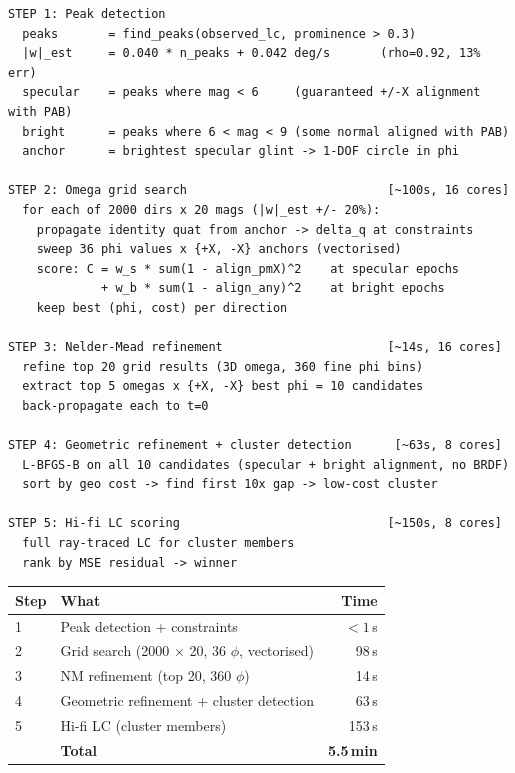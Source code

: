 \documentclass[11pt,a4paper]{article}
\begin{document}
\begin{lstlisting}
STEP 1: Peak detection
  peaks       = find_peaks(observed_lc, prominence > 0.3)
  |w|_est     = 0.040 * n_peaks + 0.042 deg/s       (rho=0.92, 13% err)
  specular    = peaks where mag < 6     (guaranteed +/-X alignment with PAB)
  bright      = peaks where 6 < mag < 9 (some normal aligned with PAB)
  anchor      = brightest specular glint -> 1-DOF circle in phi

STEP 2: Omega grid search                            [~100s, 16 cores]
  for each of 2000 dirs x 20 mags (|w|_est +/- 20%):
    propagate identity quat from anchor -> delta_q at constraints
    sweep 36 phi values x {+X, -X} anchors (vectorised)
    score: C = w_s * sum(1 - align_pmX)^2    at specular epochs
             + w_b * sum(1 - align_any)^2    at bright epochs
    keep best (phi, cost) per direction

STEP 3: Nelder-Mead refinement                       [~14s, 16 cores]
  refine top 20 grid results (3D omega, 360 fine phi bins)
  extract top 5 omegas x {+X, -X} best phi = 10 candidates
  back-propagate each to t=0

STEP 4: Geometric refinement + cluster detection      [~63s, 8 cores]
  L-BFGS-B on all 10 candidates (specular + bright alignment, no BRDF)
  sort by geo cost -> find first 10x gap -> low-cost cluster

STEP 5: Hi-fi LC scoring                             [~150s, 8 cores]
  full ray-traced LC for cluster members
  rank by MSE residual -> winner
\end{lstlisting}

\vspace{0.3em}
\begin{center}
\begin{tabular}{@{}llr@{}}
\toprule
\textbf{Step} & \textbf{What} & \textbf{Time} \\
\midrule
1 & Peak detection + constraints & $< 1$\,s \\
2 & Grid search (2000 $\times$ 20, 36 $\phi$, vectorised) & 98\,s \\
3 & NM refinement (top 20, 360 $\phi$) & 14\,s \\
4 & Geometric refinement + cluster detection & 63\,s \\
5 & Hi-fi LC (cluster members) & 153\,s \\
\midrule
  & \textbf{Total} & \textbf{5.5\,min} \\
\bottomrule
\end{tabular}
\end{center}
\end{document}

